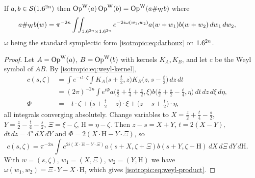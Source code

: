 \begin{proposition}\label{isotropic:prop:weyl-product}
If $a,b\in\mathcal{S}(1.6^{2n})$ then $\operatorname{Op}^{\mathrm{W}}(a)\operatorname{Op}^{\mathrm{W}}(b)=\operatorname{Op}^{\mathrm{W}}(a\#_{\mathrm W}b)$ where
\begin{equation}\label{isotropic:eq:weyl-product}
  a\#_{\mathrm W}b(w)=\pi^{-2n}\int\!\!\int_{1.6^{2n}\times1.6^{2n}}e^{-2i\omega(w_1,w_2)}a(w+w_1)b(w+w_2)\,dw_1\,dw_2,
\end{equation}
$\omega$ being the standard symplectic form \eqref{isotropic:eq:darboux} on $1.6^{2n}$.
\end{proposition}
\begin{proof}
Let $A=\operatorname{Op}^{\mathrm{W}}(a)$, $B=\operatorname{Op}^{\mathrm{W}}(b)$ with kernels $K_A,K_B$, and let $c$ be the Weyl
symbol of $AB$. By \eqref{isotropic:eq:weyl-kernel},
\begin{align*}
  c(s,\zeta)&=\int e^{-it\cdot\zeta}\int K_A\bigl(s+\tfrac t2,z\bigr)K_B\bigl(z,s-\tfrac t2\bigr)\,dz\,dt\\
  &=(2\pi)^{-2n}\int e^{i\Phi}a\bigl(\tfrac s2+\tfrac t4+\tfrac z2,\xi\bigr)b\bigl(\tfrac z2+\tfrac s2-\tfrac t4,\eta\bigr)\,dt\,dz\,d\xi\,d\eta,\\
  \Phi&=-t\cdot\zeta+\bigl(s+\tfrac t2-z\bigr)\cdot\xi+\bigl(z-s+\tfrac t2\bigr)\cdot\eta,
\end{align*}
all integrals converging absolutely. Change variables to
$X=\frac z2+\frac t4-\frac s2$, $Y=\frac z2-\frac t4-\frac s2$, $\Xi=\xi-\zeta$,
$\mathrm H=\eta-\zeta$. Then $z-s=X+Y$, $t=2(X-Y)$, $dt\,dz=4^n\,dX\,dY$ and
$\Phi=2(X\cdot\mathrm H-Y\cdot\Xi)$, so
\begin{equation*}
  c(s,\zeta)=\pi^{-2n}\int e^{2i(X\cdot\mathrm H-Y\cdot\Xi)}a(s+X,\zeta+\Xi)b(s+Y,\zeta+\mathrm H)\,dX\,d\Xi\,dY\,d\mathrm H .
\end{equation*}
With $w=(s,\zeta)$, $w_1=(X,\Xi)$, $w_2=(Y,\mathrm H)$ we have
$\omega(w_1,w_2)=\Xi\cdot Y-X\cdot\mathrm H$, which gives \eqref{isotropic:eq:weyl-product}.
\end{proof}

